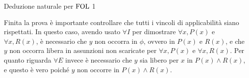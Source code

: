 \begin{example}{Deduzione naturale per \(\FOL\) 1}
\begin{prooftree}
  \end{prooftree}

  Finita la prova è importante controllare che tutti i vincoli di applicabilità siano rispettati. In questo caso, avendo usato \(\forall I\) per dimostrare \(\forall x, P(x)\) e \(\forall x, R(x)\), è necessario che \(y\) non occorra in \(\phi\), ovvero in \(P(x)\) e \(R(x)\), e che \(y\) non occorra libera in assunzioni non scaricate per \(\forall x, P(x)\) e \(\forall x, R(x)\). Per quanto riguarda \(\forall E\) invece è necessario che \(y\) sia libero per \(x\) in \(P(x) \land R(x)\), e questo è vero poiché \(y\) non occorre in \(P(x) \land R(x)\).
  \end{example}
